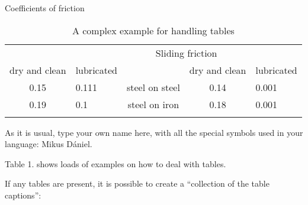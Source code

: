 \documentclass{article}
\begin{document}
\begin{table}[]
    \caption{A complex example for handling tables}
    \centering
    \renewcommand{\caption}[1]{#1}
   \caption{Coefficients of friction} \\
    \begin{tabular}{||c|l|c|c|l||}
     \hhline{|t:=====:t|}
        \multicolumn{2}{||c|}{Static friction} &  & \multicolumn{2}{|c||}{Sliding friction} \\
        \hhline{|#--#~#--#|}
        dry and clean  & lubricated &  & dry and clean & lubricated  \\
        \hhline{|:=#=#=#=#=:|}
        0.15 & 0.111 & steel on steel & 0.14 & 0.001  \\
        \hhline{||}
        0.19  & 0.1 & steel on iron & 0.18 & 0.001 \\
        \hhline{|b:=====:b|}
    \end{tabular}
    \label{tab:my_label}
\end{table}
\par
As it is usual, type your own name here, with all the special symbols used in your language: Mikus Dániel. \par
Table 1. shows loads of examples on how to deal with tables. \par
If any tables are present, it is possible to create a “collection of the table captions”:
\listoftables
\end{document}
